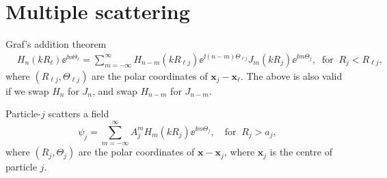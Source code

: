 \documentclass[ 12pt, a4paper]{article}
\renewcommand{\vec}[1]{\boldsymbol{#1}}
\begin{document}
\section{Multiple scattering}

Graf's addition theorem
\begin{align}
  & H_n(k R_\ell)\ee^{\ii n \Theta_\ell} =
  \sum_{m=-\infty}^\infty H_{n-m}(k R_{\ell j})\ee^{\ii(n-m)\Theta_{\ell j}} J_{m}(k R_j)\ee^{\ii m \Theta_j}, \;\;\text{for}\;\; R_j < R_{\ell j},
\label{eqn:Graf}
\end{align}
where $(R_{\ell j},\Theta_{\ell j})$ are the polar coordinates of $\vec x_j - \vec x_\ell$. The above is also valid if we swap $H_n$  for $J_n$, and swap $H_{n-m}$ for $J_{n-m}$.

Particle-$j$ scatters a field
\begin{equation}
  \label{eqn:outwaves}
  \psi_j = \sum_{m=-\infty}^\infty A_j^m H_{m}(k R_j) \ee^{\ii m \Theta_j}, \quad \text{for} \;\; R_j > a_j,
\end{equation}
where $(R_j,\Theta_j)$ are the polar coordinates of $\vec x - \vec x_j$, where $\vec x_j$ is the centre of particle $j$.
\end{document}
